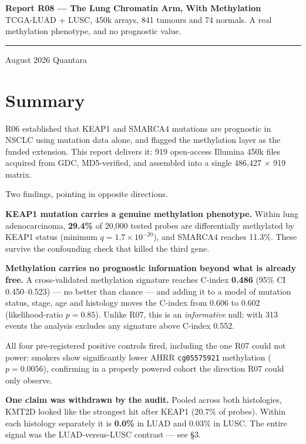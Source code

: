 \documentclass[11pt,a4paper]{article}
\begin{document}
\thispagestyle{empty}
\noindent
{\large\bfseries\color{qnavy} Report R08 --- The Lung Chromatin Arm, With Methylation}\\[2pt]
{\color{qgrey}TCGA-LUAD + LUSC, 450k arrays, 841 tumours and 74 normals. A real methylation
phenotype, and no prognostic value.}\\[6pt]
{\color{qgrey}\rule{\textwidth}{0.4pt}}

\medskip
{} August 2026 \quad\textbullet\quad Quantara

\section*{Summary}

R06 established that KEAP1 and SMARCA4 mutations are prognostic in NSCLC using mutation data
alone, and flagged the methylation layer as the funded extension. This report delivers it:
919 open-access Illumina 450k files acquired from GDC, MD5-verified, and assembled into a
single 486{,}427 $\times$ 919 matrix.

Two findings, pointing in opposite directions.

\textbf{KEAP1 mutation carries a genuine methylation phenotype.} Within lung adenocarcinoma,
\textbf{29.4\%} of 20{,}000 tested probes are differentially methylated by KEAP1 status
(minimum $q = 1.7\times10^{-20}$), and SMARCA4 reaches 11.3\%. These survive the confounding
check that killed the third gene.

\textbf{Methylation carries no prognostic information beyond what is already free.} A
cross-validated methylation signature reaches C-index \textbf{0.486} (95\% CI 0.450--0.523) ---
no better than chance --- and adding it to a model of mutation status, stage, age and histology
moves the C-index from 0.606 to 0.602 (likelihood-ratio $p = 0.85$). Unlike R07, this is an
\emph{informative} null: with 313 events the analysis excludes any signature above C-index
0.552.

All four pre-registered positive controls fired, including the one R07 could not power:
smokers show significantly lower AHRR \texttt{cg05575921} methylation ($p = 0.0056$), confirming
in a properly powered cohort the direction R07 could only observe.

\textbf{One claim was withdrawn by the audit.} Pooled across both histologies, KMT2D looked like
the strongest hit after KEAP1 (20.7\% of probes). Within each histology separately it is
\textbf{0.0\%} in LUAD and 0.03\% in LUSC. The entire signal was the LUAD-versus-LUSC contrast
--- see \S3.
\end{document}
